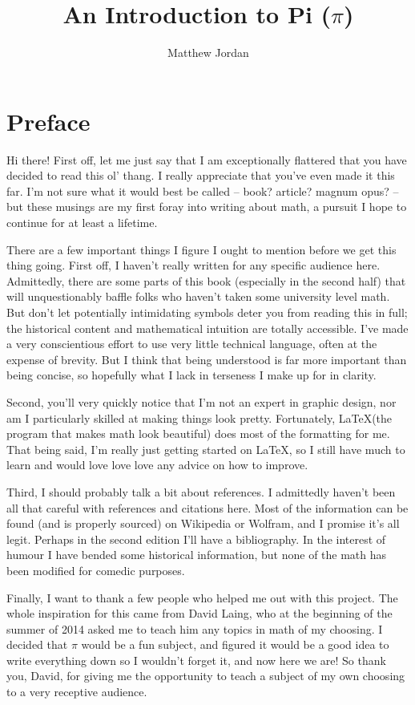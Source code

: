 \documentclass[11pt,titlepage]{article}
\title{An Introduction to Pi ($\pi$)\vspace{-0.5cm}}
\author{Matthew Jordan}
\date{June 19 2014\vspace{2cm}\begin{center}
\texttt{[image: Pi]}
\end{center}}
\begin{document}
\maketitle

\section*{Preface}

Hi there! First off, let me just say that I am exceptionally flattered that you have decided to read this ol' thang. I really appreciate that you've even made it this far. I'm not sure what it would best be called -- book? article? magnum opus? -- but these musings are my first foray into writing about math, a pursuit I hope to continue for at least a lifetime.

There are a few important things I figure I ought to mention before we get this thing going. First off, I haven't really written for any specific audience here. Admittedly, there are some parts of this book (especially in the second half) that will unquestionably baffle folks who haven't taken some university level math. But don't let potentially intimidating symbols deter you from reading this in full; the historical content and mathematical intuition are totally accessible. I've made a very conscientious effort to use very little technical language, often at the expense of brevity. But I think that being understood is far more important than being concise, so hopefully what I lack in terseness I make up for in clarity. 

Second, you'll very quickly notice that I'm not an expert in graphic design, nor am I particularly skilled at making things look pretty. Fortunately, \LaTeX (the program that makes math look beautiful) does most of the formatting for me. That being said, I'm really just getting started on \LaTeX, so I still have much to learn and would love love love any advice on how to improve.

Third, I should probably talk a bit about references. I admittedly haven't been all that careful with references and citations here. Most of the information can be found (and is properly sourced) on Wikipedia or Wolfram, and I promise it's all legit. Perhaps in the second edition I'll have a bibliography. In the interest of humour I have bended some historical information, but none of the math has been modified for comedic purposes. 

Finally, I want to thank a few people who helped me out with this project. The whole inspiration for this came from David Laing, who at the beginning of the summer of 2014 asked me to teach him any topics in math of my choosing. I decided that $\pi$ would be a fun subject, and figured it would be a good idea to write everything down so I wouldn't forget it, and now here we are! So thank you, David, for giving me the opportunity to teach a subject of my own choosing to a very receptive audience. 
\end{document}
